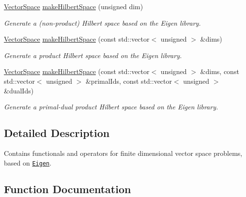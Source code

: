 \begin{DoxyCompactItemize}
\item 
\hyperlink{classSpacy_1_1VectorSpace}{Vector\+Space} \hyperlink{namespaceSpacy_1_1Rn_abadd5b9e11793fdb2f689a3ee908e5e7}{make\+Hilbert\+Space} (unsigned dim)
\begin{DoxyCompactList}\small\item\em Generate a (non-\/product) Hilbert space based on the Eigen library. \end{DoxyCompactList}\item 
\hyperlink{classSpacy_1_1VectorSpace}{Vector\+Space} \hyperlink{namespaceSpacy_1_1Rn_a4e9d4ebff60dde8a465a464531af13e1}{make\+Hilbert\+Space} (const std\+::vector$<$ unsigned $>$ \&dims)\hypertarget{namespaceSpacy_1_1Rn_a4e9d4ebff60dde8a465a464531af13e1}{}\label{namespaceSpacy_1_1Rn_a4e9d4ebff60dde8a465a464531af13e1}

\begin{DoxyCompactList}\small\item\em Generate a product Hilbert space based on the Eigen library. \end{DoxyCompactList}\item 
\hyperlink{classSpacy_1_1VectorSpace}{Vector\+Space} \hyperlink{namespaceSpacy_1_1Rn_a5df449d080e704158ff479c36634ee74}{make\+Hilbert\+Space} (const std\+::vector$<$ unsigned $>$ \&dims, const std\+::vector$<$ unsigned $>$ \&primal\+Ids, const std\+::vector$<$ unsigned $>$ \&dual\+Ids)\hypertarget{namespaceSpacy_1_1Rn_a5df449d080e704158ff479c36634ee74}{}\label{namespaceSpacy_1_1Rn_a5df449d080e704158ff479c36634ee74}

\begin{DoxyCompactList}\small\item\em Generate a primal-\/dual product Hilbert space based on the Eigen library. \end{DoxyCompactList}\end{DoxyCompactItemize}


\subsection{Detailed Description}
Contains functionals and operators for finite dimensional vector space problems, based on \href{http://eigen.tuxfamily.org}{\tt Eigen}. 

\subsection{Function Documentation}
